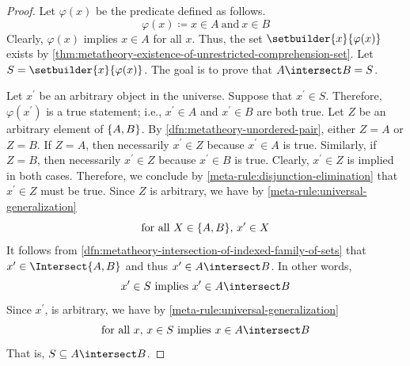 \begin{proof}
    Let \( \varphi(x) \) be the predicate defined as follows.
    \begin{equation*}
        \varphi(x) \coloneq x \in A \ \text{and} \ x \in B
    \end{equation*}
    Clearly, \( \varphi(x) \) implies \( x \in A \) for all \( x \).
    Thus, the set \( \setbuilder{x}{\varphi(x)} \) exists by \cref{thm:metatheory-existence-of-unrestricted-comprehension-set}.
    Let \( S = \setbuilder{x}{\varphi(x)} \).
    The goal is to prove that \( A \intersect B = S \).

    \vspace{0.3cm}
    \noindent
    Let \( x^{\prime} \) be an arbitrary object in the universe.
    Suppose that \( x^{\prime} \in S \).
    Therefore, \( \varphi(x^{\prime}) \) is a true statement; i.e., \( x^{\prime} \in A \) and \( x^{\prime} \in B \) are both true.
    Let \( Z \) be an arbitrary element of \( \mleft\{ A, B \mright\} \).
    By \cref{dfn:metatheory-unordered-pair}, either \( Z = A \) or \( Z = B \).
    If \( Z = A \), then necessarily \( x^{\prime} \in Z \) because \( x^{\prime} \in A \) is true.
    Similarly, if \( Z = B \), then necessarily \( x^{\prime} \in Z \) because \( x^{\prime} \in B \) is true.
    Clearly, \( x^{\prime} \in Z \) is implied in both cases.
    Therefore, we conclude by \cref{meta-rule:disjunction-elimination} that \( x^{\prime} \in Z \) must be true.
    Since \( Z \) is arbitrary, we have by \cref{meta-rule:universal-generalization}
    \begin{equation*}
        \text{for all \( X \in \mleft\{ A, B \mright\} \), \( x^{\prime} \in X \)}
    \end{equation*}
    It follows from \cref{dfn:metatheory-intersection-of-indexed-family-of-sets} that \( x^{\prime} \in \Intersect \mleft\{ A, B \mright\} \) and
    thus \( x^{\prime} \in A \intersect B \).
    In other words,
    \begin{equation*}
        x^{\prime} \in S \ \text{implies} \ x^{\prime} \in A \intersect B
    \end{equation*}
    Since \( x^{\prime} \), is arbitrary, we have by \cref{meta-rule:universal-generalization}
    \begin{equation*}
        \text{for all \( x \), \( x \in S \) implies \( x  \in A \intersect B \)}
    \end{equation*}
    That is, \( S \subseteq A \intersect B \).


\end{proof}
